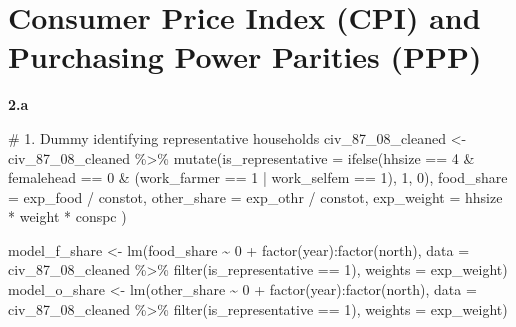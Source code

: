 \documentclass[
  letterpaper,
  DIV=11,
  numbers=noendperiod]{scrartcl}
\newenvironment{Shaded}{\begin{snugshade}}{\end{snugshade}}
\newcommand{\AttributeTok}[1]{\textcolor[rgb]{0.40,0.45,0.13}{#1}}
\newcommand{\CommentTok}[1]{\textcolor[rgb]{0.37,0.37,0.37}{#1}}
\newcommand{\DecValTok}[1]{\textcolor[rgb]{0.68,0.00,0.00}{#1}}
\newcommand{\FunctionTok}[1]{\textcolor[rgb]{0.28,0.35,0.67}{#1}}
\newcommand{\NormalTok}[1]{\textcolor[rgb]{0.00,0.23,0.31}{#1}}
\newcommand{\OtherTok}[1]{\textcolor[rgb]{0.00,0.23,0.31}{#1}}
\newcommand{\SpecialCharTok}[1]{\textcolor[rgb]{0.37,0.37,0.37}{#1}}
\begin{document}
\section{Consumer Price Index (CPI) and Purchasing Power Parities
(PPP)}\label{consumer-price-index-cpi-and-purchasing-power-parities-ppp}

\textbf{2.a}

\begin{Shaded}
\begin{Highlighting}[]
\CommentTok{\# 1. Dummy identifying representative households}
\NormalTok{civ\_87\_08\_cleaned }\OtherTok{\textless{}{-}}\NormalTok{ civ\_87\_08\_cleaned }\SpecialCharTok{\%\textgreater{}\%}
  \FunctionTok{mutate}\NormalTok{(}\AttributeTok{is\_representative =} \FunctionTok{ifelse}\NormalTok{(hhsize }\SpecialCharTok{==} \DecValTok{4} \SpecialCharTok{\&}\NormalTok{ femalehead }\SpecialCharTok{==} \DecValTok{0} \SpecialCharTok{\&}\NormalTok{ (work\_farmer }\SpecialCharTok{==} \DecValTok{1} \SpecialCharTok{|}\NormalTok{ work\_selfem }\SpecialCharTok{==} \DecValTok{1}\NormalTok{), }\DecValTok{1}\NormalTok{, }\DecValTok{0}\NormalTok{),}
         \AttributeTok{food\_share =}\NormalTok{ exp\_food }\SpecialCharTok{/}\NormalTok{ constot,}
         \AttributeTok{other\_share =}\NormalTok{ exp\_othr }\SpecialCharTok{/}\NormalTok{ constot,}
         \AttributeTok{exp\_weight =}\NormalTok{ hhsize }\SpecialCharTok{*}\NormalTok{ weight }\SpecialCharTok{*}\NormalTok{ conspc}
\NormalTok{         )}

\NormalTok{model\_f\_share }\OtherTok{\textless{}{-}} \FunctionTok{lm}\NormalTok{(food\_share }\SpecialCharTok{\textasciitilde{}} \DecValTok{0} \SpecialCharTok{+} \FunctionTok{factor}\NormalTok{(year)}\SpecialCharTok{:}\FunctionTok{factor}\NormalTok{(north), }\AttributeTok{data =}\NormalTok{ civ\_87\_08\_cleaned }\SpecialCharTok{\%\textgreater{}\%} \FunctionTok{filter}\NormalTok{(is\_representative }\SpecialCharTok{==} \DecValTok{1}\NormalTok{), }\AttributeTok{weights =}\NormalTok{ exp\_weight)}
\NormalTok{model\_o\_share }\OtherTok{\textless{}{-}} \FunctionTok{lm}\NormalTok{(other\_share }\SpecialCharTok{\textasciitilde{}} \DecValTok{0} \SpecialCharTok{+} \FunctionTok{factor}\NormalTok{(year)}\SpecialCharTok{:}\FunctionTok{factor}\NormalTok{(north), }\AttributeTok{data =}\NormalTok{ civ\_87\_08\_cleaned }\SpecialCharTok{\%\textgreater{}\%} \FunctionTok{filter}\NormalTok{(is\_representative }\SpecialCharTok{==} \DecValTok{1}\NormalTok{), }\AttributeTok{weights =}\NormalTok{ exp\_weight)}
\end{Highlighting}
\end{Shaded}
\end{document}
